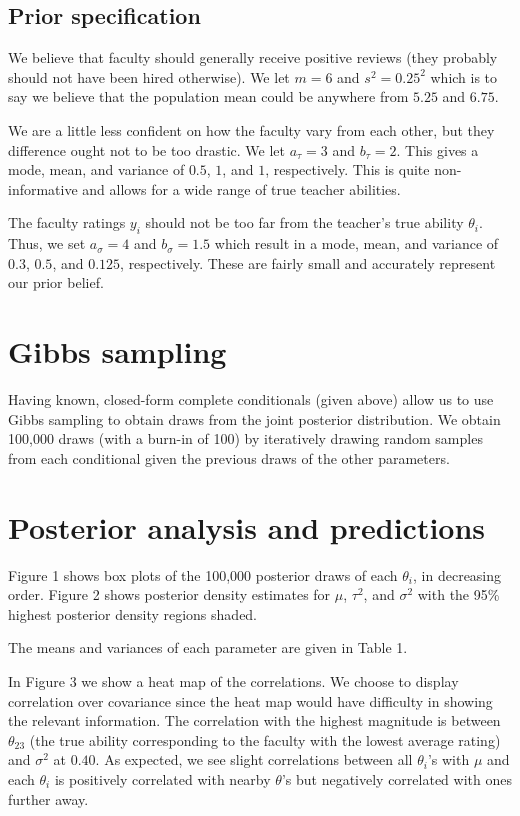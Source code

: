 \documentclass[12pt]{article}
\begin{document}
\subsection{Prior specification}

\noindent We believe that faculty should generally receive positive reviews (they probably should not have been hired otherwise). We let $m=6$ and $s^2=0.25^2$ which is to say we believe that the population mean could be anywhere from $5.25$ and $6.75$.
\bigskip

\noindent We are a little less confident on how the faculty vary from each other, but they difference ought not to be too drastic. We let $a_\tau=3$ and $b_\tau=2$. This gives a mode, mean, and variance of $0.5$, $1$, and $1$, respectively. This is quite non-informative and allows for a wide range of true teacher abilities.
\bigskip

\noindent The faculty ratings $y_i$ should not be too far from the teacher's true ability $\theta_i$. Thus, we set $a_\sigma=4$ and $b_\sigma=1.5$ which result in a mode, mean, and variance of $0.3$, $0.5$, and $0.125$, respectively. These are fairly small and accurately represent our prior belief.

\section{Gibbs sampling}

\noindent Having known, closed-form complete conditionals (given above) allow us to use Gibbs sampling to obtain draws from the joint posterior distribution. We obtain 100,000 draws (with a burn-in of 100) by iteratively drawing random samples from each conditional given the previous draws of the other parameters.

\section{Posterior analysis and predictions}

\noindent Figure 1 shows box plots of the 100,000 posterior draws of each $\theta_i$, in decreasing order. Figure 2 shows posterior density estimates for $\mu$, $\tau^2$, and $\sigma^2$ with the 95\% highest posterior density regions shaded.
\bigskip

\noindent The means and variances of each parameter are given in Table 1.
\bigskip

\noindent In Figure 3 we show a heat map of the correlations. We choose to display correlation over covariance since the heat map would have difficulty in showing the relevant information. The correlation with the highest magnitude is between $\theta_{23}$ (the true ability corresponding to the faculty with the lowest average rating) and $\sigma^2$ at $0.40$. As expected, we see slight correlations between all $\theta_i$'s with $\mu$ and each $\theta_i$ is positively correlated with nearby $\theta$'s but negatively correlated with ones further away.
\bigskip
\end{document}
